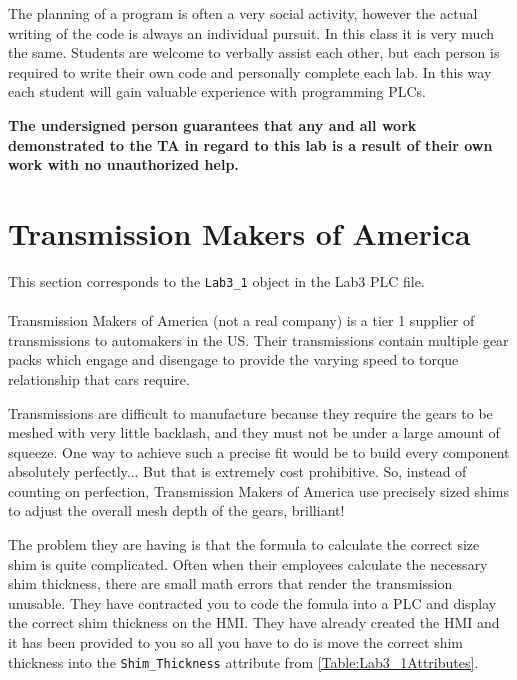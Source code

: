 The planning of a program is often a very social activity, however the actual writing of the code is always an individual pursuit. In this class it is very much the same. Students are welcome to verbally assist each other, but each person is required to write their own code and personally complete each lab. In this way each student will gain valuable experience with programming PLCs. 

\textbf{The undersigned person guarantees that any and all work demonstrated to the TA in regard to this lab is a result of their own work with no unauthorized help.}



\section{Transmission Makers of America}

This section corresponds to the \verb|Lab3_1| object in the Lab3 PLC file.
\\ 
\\
Transmission Makers of America (not a real company) is a tier 1 supplier of transmissions to automakers in the US. Their transmissions contain multiple gear packs which engage and disengage to provide the varying speed to torque relationship that cars require. 

Transmissions are difficult to manufacture because they require the gears to be meshed with very little backlash, and they must not be under a large amount of squeeze. One way to achieve such a precise fit would be to build every component absolutely perfectly... But that is extremely cost prohibitive. So, instead of counting on perfection, Transmission Makers of America use precisely sized shims to adjust the overall mesh depth of the gears, brilliant! 

The problem they are having is that the formula to calculate the correct size shim is quite complicated. Often when their employees calculate the necessary shim thickness, there are small math errors that render the transmission unusable. They have contracted you to code the fomula into a PLC and display the correct shim thickness on the HMI. They have already created the HMI and it has been provided to you so all you have to do is move the correct shim thickness into the \verb|Shim_Thickness| attribute from \tableautorefname \ref{Table:Lab3_1Attributes}. 


